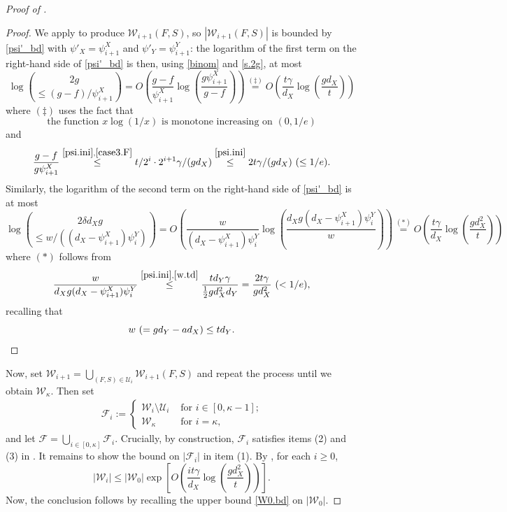 \documentclass[a4paper]{amsart}
\theoremstyle{definition}
\newcommand{\cF}{\mathcal{F} }
\newcommand{\cU}{\mathcal{U} }
\newcommand{\cW}{\mathcal{W} }
\newcommand{\beq}[1]{\begin{equation}\label{#1}}
\newcommand{\enq}[0]{\end{equation}}
\newcommand{\0}[0]{\emptyset}
\begin{document}
\begin{proof}[Proof of ]
\begin{proof}
We apply  to produce $\cW_{i+1}(F,S)$, so $|\cW_{i+1}(F,S)|$ is bounded by \eqref{psi'_bd} with $\psi'_X=\psi^X_{i+1}$ and $\psi'_Y=\psi^Y_{i+1}$:  the logarithm of the first term on the right-hand side of \eqref{psi'_bd} is then, using \eqref{binom} and \eqref{s.2g}, at most
    \[\log{2g \choose \le (g-f)/\psi^X_{i+1}}=O\left(\frac{g-f}{\psi^X_{i+1}}\log \left(\frac{g\psi^X_{i+1}}{g-f}\right)\right)\stackrel{(\ddagger)}{=}O\left(\frac{t\gamma}{d_X}\log \left(\frac{gd_X}{t}\right)\right)\]
    where $(\ddagger)$ uses the fact that 
    \beq{1overx} \text{the function $x\log(1/x)$ is monotone increasing on $(0, 1/e)$}\enq
    and 
    \[\frac{g-f}{g\psi^X_{i+1}} \stackrel{\eqref{psi.ini},\eqref{case3.F}}{\le} t/2^i\cdot 2^{i+1}\gamma/(gd_X) \stackrel{\eqref{psi.ini}}{\le} 2t\gamma/(gd_X)~(\leq 1/e).\]
Similarly, the logarithm of the second term on the right-hand side of \eqref{psi'_bd} is at most
    \[\log{2\delta d_X g \choose \le w/((d_X-\psi^X_{i+1})\psi^Y_i)}=O\left(\frac{w}{(d_X-\psi^X_{i+1})\psi^Y_i}\log \left(\frac{d_X g (d_X-\psi^X_{i+1})\psi^Y_i}{w}\right)\right)\stackrel{(*)}{=}O\left(\frac{t\gamma}{d_X}\log\left(\frac{gd_X^2}{t}\right) \right)\]
where $(*)$ follows from
\[\frac{w}{d_Xg(d_X-\psi_{i+1}^X)\psi_i^Y} \stackrel{\eqref{psi.ini}, \eqref{w.td}}{\le} \frac{td_Y\gamma}{\frac{1}{2}gd_X^2d_Y}=\frac{2t\gamma}{gd_X^2}~(<1/e),\]
recalling that 
\beq{w.td} w~(=gd_Y-ad_X)\leq td_Y. \qedhere \enq
\end{proof}

Now, set $\cW_{i+1}=\bigcup_{(F,S) \in \cU_i}\cW_{i+1}(F,S)$ and repeat the process until we obtain $\cW_{\kappa}$. Then set
\begin{align}\label{eq:FiDef}
\cF_i:=\begin{cases} \cW_i \setminus \cU_i & \text{ for $i \in [0, \kappa-1]$;}\\
\cW_\kappa & \text{ for $i=\kappa$},\end{cases}
\end{align}
and let $\mathcal{F}=\bigcup_{i \in [0, \kappa]} \cF_i$. Crucially, by construction, $\cF_i$ satisfies items (2) and (3) in . It remains to show the bound on $|\cF_i|$ in item (1).
By , for each $i\geq 0$,
    \beq{total.containers}|\cW_i|\leq |\cW_0|\exp\left[O\left(\frac{it\gamma}{d_X} \log \left(\frac{gd_X^2}{t}\right)\right)\right].\enq
Now, the conclusion follows by recalling the upper bound \eqref{W0.bd} on $|\cW_0|$.\end{proof}
\end{document}
